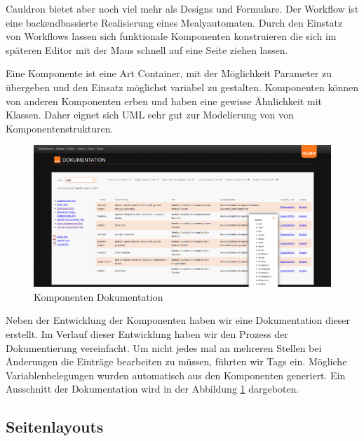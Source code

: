 \documentclass[12pt]{article}
\begin{document}
Cauldron bietet aber noch viel mehr als Designs und Formulare. Der Workflow ist eine backendbassierte Realisierung eines 
Mealyautomaten. Durch den Einstatz von Workflows lassen sich funktionale Komponenten konstruieren die sich im späteren Editor
mit der Maus schnell auf eine Seite ziehen lassen.

Eine Komponente ist eine Art Container, mit der Möglichkeit Parameter zu übergeben und den Einsatz möglichst variabel zu gestalten.
Komponenten können von anderen Komponenten erben und haben eine gewisse Ähnlichkeit mit Klassen. Daher eignet sich UML sehr gut zur
Modelierung von von Komponentenstrukturen.

\begin{figure}[h]
	\centering
	\includegraphics[width=1.0\textwidth]{DokuPage.png}
	\caption{Komponenten Dokumentation}
	\label{fig:DokuPage}
\end{figure}

Neben der Entwicklung der Komponenten haben wir eine Dokumentation dieser erstellt. Im Verlauf dieser Entwicklung haben wir
den Prozess der Dokumentierung vereinfacht. Um nicht jedes mal an mehreren Stellen bei Änderungen die Einträge bearbeiten zu müssen,
führten wir Tags ein. Mögliche Variablenbelegungen wurden automatisch aus den Komponenten generiert. Ein Ausschnitt der Dokumentation
wird in der Abbildung \ref{fig:DokuPage} dargeboten.

\subsection{Seitenlayouts}
\end{document}
